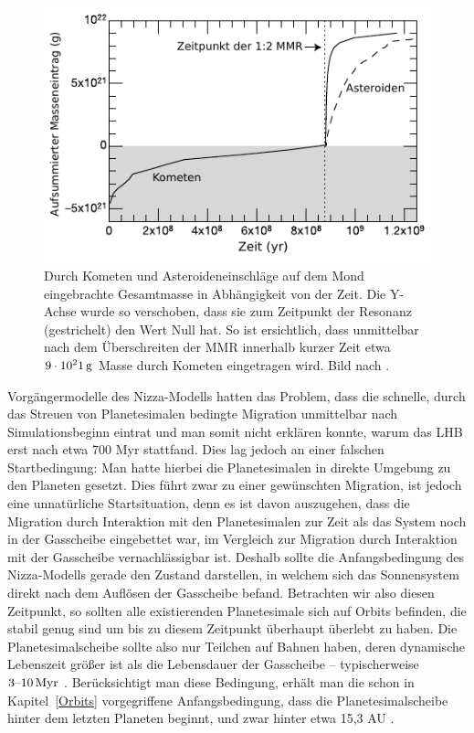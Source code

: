 \documentclass[12pt,a4paper,twoside,open=right,bibliography=totoc]{scrbook}
\renewcommand{\cite}{ \citep}
\begin{document}
\begin{figure}
\centering 
\includegraphics[scale=1]{img/Gomes2005-3}
\caption{Durch Kometen und Asteroideneinschläge auf dem Mond eingebrachte Gesamtmasse in Abhängigkeit von der Zeit. Die Y-Achse wurde so verschoben, dass sie zum Zeitpunkt der Resonanz (gestrichelt) den Wert Null hat. So ist ersichtlich, dass unmittelbar nach dem Überschreiten der MMR innerhalb kurzer Zeit etwa $\unit[9\cdot10^21]{g}$ Masse durch Kometen eingetragen wird. Bild nach \cite{Gomes2005}.}
\label{fig:LHBMasse}
\end{figure}
Vorgängermodelle des Nizza-Modells hatten das Problem, dass die schnelle, durch das Streuen von Planetesimalen bedingte Migration unmittelbar nach Simulationsbeginn eintrat und man somit nicht erklären konnte, warum das LHB erst nach etwa 700 Myr stattfand.
Dies lag jedoch an einer falschen Startbedingung: Man hatte hierbei die Planetesimalen in direkte Umgebung zu den Planeten gesetzt. Dies führt zwar zu einer gewünschten Migration, ist jedoch eine unnatürliche Startsituation,
denn es ist davon auszugehen, dass die Migration durch Interaktion mit den Planetesimalen zur Zeit als das System noch in der Gasscheibe eingebettet war, im Vergleich zur Migration durch Interaktion mit der Gasscheibe vernachlässigbar ist.
Deshalb sollte die Anfangsbedingung des Nizza-Modells gerade den Zustand darstellen, in welchem sich das Sonnensystem direkt nach dem Auflösen der Gasscheibe befand. Betrachten wir also diesen Zeitpunkt, so sollten alle existierenden Planetesimale sich auf Orbits befinden, die stabil genug sind um bis zu diesem Zeitpunkt überhaupt überlebt zu haben.
Die Planetesimalscheibe sollte also nur Teilchen auf Bahnen haben, deren dynamische Lebenszeit größer ist als die Lebensdauer der Gasscheibe – typischerweise $\unit[3\text{--}10]{Myr}$\cite{Haisch2001}\cite{Gomes2005}.
Berücksichtigt man diese Bedingung, erhält man die schon in Kapitel~\ref{Orbits} vorgegriffene Anfangsbedingung, dass die Planetesimalscheibe hinter dem letzten Planeten beginnt, und zwar hinter etwa 15,3 AU\cite{Gomes2005}.
\end{document}

